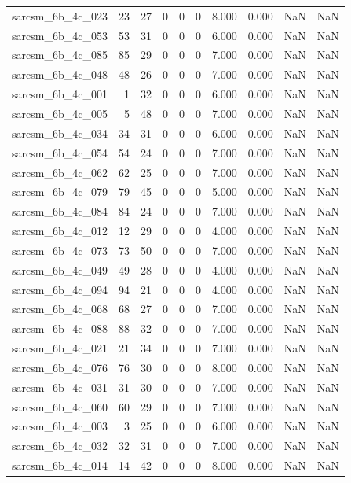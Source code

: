 \documentclass{article}
\begin{document}
\begin{longtable}{lrrrrrrrrr}
sarcsm\_6b\_4c\_023 & 23 & 27 & 0 & 0 & 0 & 8.000 & 0.000 & NaN & NaN \\
sarcsm\_6b\_4c\_053 & 53 & 31 & 0 & 0 & 0 & 6.000 & 0.000 & NaN & NaN \\
sarcsm\_6b\_4c\_085 & 85 & 29 & 0 & 0 & 0 & 7.000 & 0.000 & NaN & NaN \\
sarcsm\_6b\_4c\_048 & 48 & 26 & 0 & 0 & 0 & 7.000 & 0.000 & NaN & NaN \\
sarcsm\_6b\_4c\_001 & 1 & 32 & 0 & 0 & 0 & 6.000 & 0.000 & NaN & NaN \\
sarcsm\_6b\_4c\_005 & 5 & 48 & 0 & 0 & 0 & 7.000 & 0.000 & NaN & NaN \\
sarcsm\_6b\_4c\_034 & 34 & 31 & 0 & 0 & 0 & 6.000 & 0.000 & NaN & NaN \\
sarcsm\_6b\_4c\_054 & 54 & 24 & 0 & 0 & 0 & 7.000 & 0.000 & NaN & NaN \\
sarcsm\_6b\_4c\_062 & 62 & 25 & 0 & 0 & 0 & 7.000 & 0.000 & NaN & NaN \\
sarcsm\_6b\_4c\_079 & 79 & 45 & 0 & 0 & 0 & 5.000 & 0.000 & NaN & NaN \\
sarcsm\_6b\_4c\_084 & 84 & 24 & 0 & 0 & 0 & 7.000 & 0.000 & NaN & NaN \\
sarcsm\_6b\_4c\_012 & 12 & 29 & 0 & 0 & 0 & 4.000 & 0.000 & NaN & NaN \\
sarcsm\_6b\_4c\_073 & 73 & 50 & 0 & 0 & 0 & 7.000 & 0.000 & NaN & NaN \\
sarcsm\_6b\_4c\_049 & 49 & 28 & 0 & 0 & 0 & 4.000 & 0.000 & NaN & NaN \\
sarcsm\_6b\_4c\_094 & 94 & 21 & 0 & 0 & 0 & 4.000 & 0.000 & NaN & NaN \\
sarcsm\_6b\_4c\_068 & 68 & 27 & 0 & 0 & 0 & 7.000 & 0.000 & NaN & NaN \\
sarcsm\_6b\_4c\_088 & 88 & 32 & 0 & 0 & 0 & 7.000 & 0.000 & NaN & NaN \\
sarcsm\_6b\_4c\_021 & 21 & 34 & 0 & 0 & 0 & 7.000 & 0.000 & NaN & NaN \\
sarcsm\_6b\_4c\_076 & 76 & 30 & 0 & 0 & 0 & 8.000 & 0.000 & NaN & NaN \\
sarcsm\_6b\_4c\_031 & 31 & 30 & 0 & 0 & 0 & 7.000 & 0.000 & NaN & NaN \\
sarcsm\_6b\_4c\_060 & 60 & 29 & 0 & 0 & 0 & 7.000 & 0.000 & NaN & NaN \\
sarcsm\_6b\_4c\_003 & 3 & 25 & 0 & 0 & 0 & 6.000 & 0.000 & NaN & NaN \\
sarcsm\_6b\_4c\_032 & 32 & 31 & 0 & 0 & 0 & 7.000 & 0.000 & NaN & NaN \\
sarcsm\_6b\_4c\_014 & 14 & 42 & 0 & 0 & 0 & 8.000 & 0.000 & NaN & NaN \\

\end{longtable}
\end{document}
